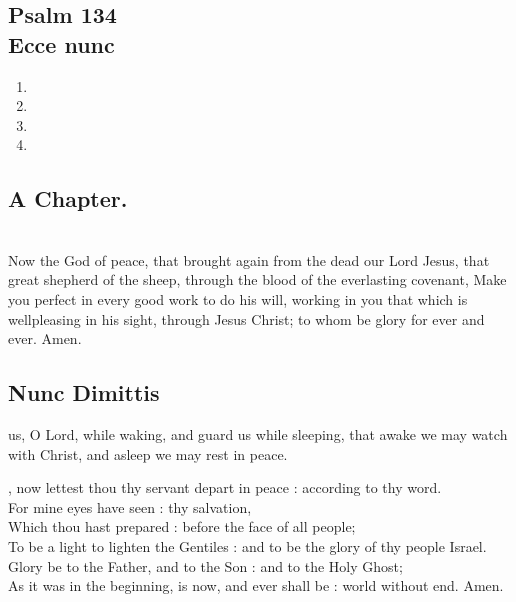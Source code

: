 \subsection{Psalm 134\\
Ecce nunc}
\begin{enumerate}
\item {}
\item {}
\item {}
\item {}
\end{enumerate}

\subsection{A Chapter.}

\\
Now the God of peace, that brought again from the dead our Lord Jesus, that great shepherd of the sheep, through the blood of the everlasting covenant,
Make you perfect in every good work to do his will, working in you that which is wellpleasing in his sight, through Jesus Christ; to whom be glory for ever and ever.
Amen.


\subsection{Nunc Dimittis}

 us, O Lord, while waking,
and guard us while sleeping,
that awake we may watch with Christ,
and asleep we may rest in peace.

, now lettest thou thy servant depart in peace : according to thy word.\\
For mine eyes have seen : thy salvation,\\
Which thou hast prepared : before the face of all people;\\
To be a light to lighten the Gentiles : and to be the glory of thy people Israel.\\
Glory be to the Father, and to the Son : and to the Holy Ghost;\\
As it was in the beginning, is now, and ever shall be : world without end. Amen.

